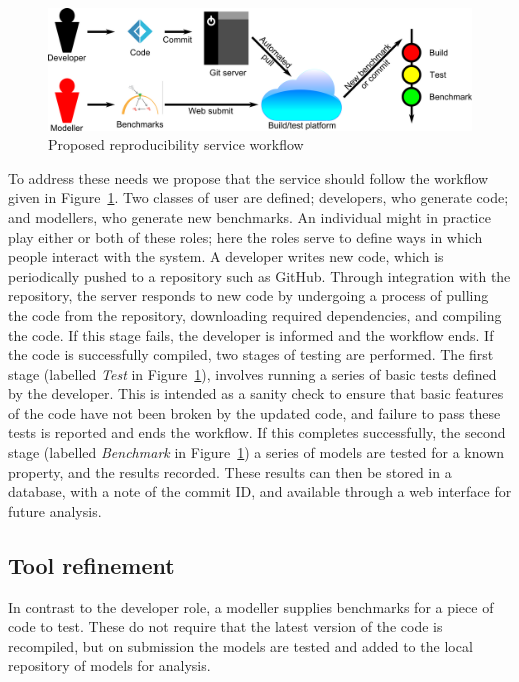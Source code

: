 \documentclass{llncs}
\begin{document}
\begin{figure}[!ht]
	\centering
	\includegraphics[width=\textwidth]{workflow}
	\caption{Proposed reproducibility service workflow}
	\label{schematic}
\end{figure}
	
To address these needs we propose that the service should follow the
workflow given in Figure~\ref{schematic}. Two classes of user are
defined; developers, who generate code; and modellers, who generate
new benchmarks. An individual might in practice play either or both of
these roles; here the roles serve to define ways in which people
interact with the system. A developer writes new code, which is
periodically pushed to a repository such as GitHub. Through
integration with the repository, the server responds to new code by
undergoing a process of pulling the code from the repository,
downloading required dependencies, and compiling the code. If this
stage fails, the developer is informed and the workflow ends. If the
code is successfully compiled, two stages of testing are
performed. The first stage (labelled {\emph{Test}} in
Figure~\ref{schematic}), involves running a series of basic tests
defined by the developer. This is intended as a sanity check to ensure
that basic features of the code have not been broken by the updated
code, and failure to pass these tests is reported and ends the
workflow. If this completes successfully, the second stage (labelled
{\emph{Benchmark}} in Figure~\ref{schematic}) a series of models are
tested for a known property, and the results recorded. These results
can then be stored in a database, with a note of the commit ID, and
available through a web interface for future analysis.

\subsection{Tool refinement}

In contrast to the developer role, a modeller supplies benchmarks for
a piece of code to test. These do not require that the latest version
of the code is recompiled, but on submission the models are tested and
added to the local repository of models for analysis. 
\end{document}
